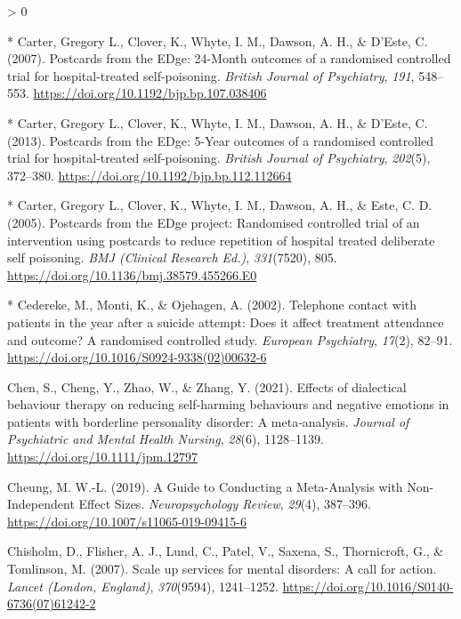 \documentclass[
  english,
  man]{apa6}
\newlength{\cslhangindent}
\newenvironment{CSLReferences}[2] %
 {%
  \setlength{\parindent}{0pt}
  \ifodd #1 \everypar{\setlength{\hangindent}{\cslhangindent}}\ignorespaces\fi
  \ifnum #2 > 0
  \setlength{\parskip}{#2\baselineskip}
  \fi
 }%
 {}
\begin{document}
\begin{CSLReferences}{1}{0}
\leavevmode\hypertarget{ref-carter2007}{}%
* Carter, Gregory L., Clover, K., Whyte, I. M., Dawson, A. H., \& D'Este, C. (2007). Postcards from the {EDge}: 24-{Month} outcomes of a randomised controlled trial for hospital-treated self-poisoning. \emph{British Journal of Psychiatry}, \emph{191}, 548--553. \url{https://doi.org/10.1192/bjp.bp.107.038406}

\leavevmode\hypertarget{ref-carter2013}{}%
* Carter, Gregory L., Clover, K., Whyte, I. M., Dawson, A. H., \& D'Este, C. (2013). Postcards from the {EDge}: 5-{Year} outcomes of a randomised controlled trial for hospital-treated self-poisoning. \emph{British Journal of Psychiatry}, \emph{202}(5), 372--380. \url{https://doi.org/10.1192/bjp.bp.112.112664}

\leavevmode\hypertarget{ref-carter2005}{}%
* Carter, Gregory L., Clover, K., Whyte, I. M., Dawson, A. H., \& Este, C. D. (2005). Postcards from the {EDge} project: {Randomised} controlled trial of an intervention using postcards to reduce repetition of hospital treated deliberate self poisoning. \emph{BMJ (Clinical Research Ed.)}, \emph{331}(7520), 805. \url{https://doi.org/10.1136/bmj.38579.455266.E0}

\leavevmode\hypertarget{ref-cedereke2002}{}%
* Cedereke, M., Monti, K., \& Ojehagen, A. (2002). Telephone contact with patients in the year after a suicide attempt: {Does} it affect treatment attendance and outcome? {A} randomised controlled study. \emph{European Psychiatry}, \emph{17}(2), 82--91. \url{https://doi.org/10.1016/S0924-9338(02)00632-6}

\leavevmode\hypertarget{ref-chen2021}{}%
Chen, S., Cheng, Y., Zhao, W., \& Zhang, Y. (2021). Effects of dialectical behaviour therapy on reducing self‐harming behaviours and negative emotions in patients with borderline personality disorder: {A} meta‐analysis. \emph{Journal of Psychiatric and Mental Health Nursing}, \emph{28}(6), 1128--1139. \url{https://doi.org/10.1111/jpm.12797}

\leavevmode\hypertarget{ref-cheung2019}{}%
Cheung, M. W.-L. (2019). A {Guide} to {Conducting} a {Meta-Analysis} with {Non-Independent Effect Sizes}. \emph{Neuropsychology Review}, \emph{29}(4), 387--396. \url{https://doi.org/10.1007/s11065-019-09415-6}

\leavevmode\hypertarget{ref-chisholm2007}{}%
Chisholm, D., Flisher, A. J., Lund, C., Patel, V., Saxena, S., Thornicroft, G., \& Tomlinson, M. (2007). Scale up services for mental disorders: {A} call for action. \emph{Lancet (London, England)}, \emph{370}(9594), 1241--1252. \url{https://doi.org/10.1016/S0140-6736(07)61242-2}


\end{CSLReferences}
\end{document}
